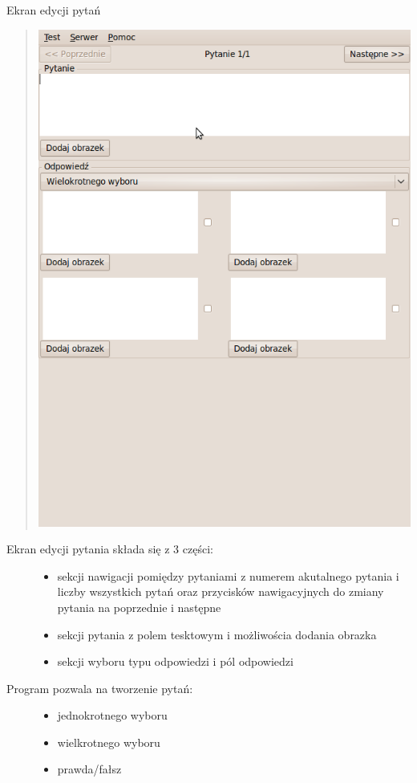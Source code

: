 \documentclass[letterpaper,10pt,polish]{sphinxmanual}
\begin{document}
Ekran edycji pytań
\begin{quote}

\includegraphics{OknoEdycjiPytania.png}
\end{quote}
\begin{description}
\item[{Ekran edycji pytania składa się z 3 części:}] \leavevmode\begin{itemize}
\item {} 
sekcji nawigacji pomiędzy pytaniami z numerem akutalnego pytania i liczby wszystkich pytań oraz przycisków nawigacyjnych do zmiany pytania na poprzednie i następne

\item {} 
sekcji pytania z polem tesktowym i możliwościa dodania obrazka

\item {} 
sekcji wyboru typu odpowiedzi i pól odpowiedzi

\end{itemize}

\item[{Program pozwala na tworzenie pytań:}] \leavevmode\begin{itemize}
\item {} 
jednokrotnego wyboru

\item {} 
wielkrotnego wyboru

\item {} 
prawda/fałsz

\end{itemize}

\end{description}
\end{document}

